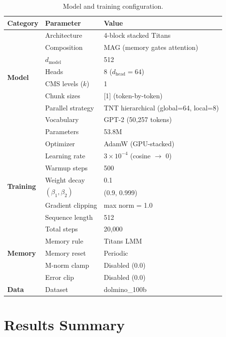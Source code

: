 \documentclass[11pt,a4paper]{article}
\begin{document}
\begin{table}[H]
\centering
\caption{Model and training configuration.}
\label{tab:config}
\begin{tabular}{@{}lll@{}}
\toprule
\textbf{Category} & \textbf{Parameter} & \textbf{Value} \\
\midrule
\multirow{8}{*}{\textbf{Model}}
    & Architecture      & 4-block stacked Titans \\
    & Composition       & MAG (memory gates attention) \\
    & $d_\text{model}$  & 512 \\
    & Heads             & 8 ($d_\text{head} = 64$) \\
    & CMS levels ($k$)  & 1 \\
    & Chunk sizes       & [1] (token-by-token) \\
    & Parallel strategy & TNT hierarchical (global=64, local=8) \\
    & Vocabulary        & GPT-2 (50{,}257 tokens) \\
    & Parameters        & 53.8M \\
\midrule
\multirow{8}{*}{\textbf{Training}}
    & Optimizer         & AdamW (GPU-stacked) \\
    & Learning rate     & $3 \times 10^{-4}$ (cosine $\to$ 0) \\
    & Warmup steps      & 500 \\
    & Weight decay      & 0.1 \\
    & $(\beta_1, \beta_2)$ & (0.9, 0.999) \\
    & Gradient clipping & max norm = 1.0 \\
    & Sequence length   & 512 \\
    & Total steps       & 20{,}000 \\
\midrule
\multirow{3}{*}{\textbf{Memory}}
    & Memory rule       & Titans LMM \\
    & Memory reset      & Periodic \\
    & M-norm clamp      & Disabled (0.0) \\
    & Error clip        & Disabled (0.0) \\
\midrule
\textbf{Data}
    & Dataset           & dolmino\_100b \\
\bottomrule
\end{tabular}
\end{table}


\section{Results Summary}
\end{document}
